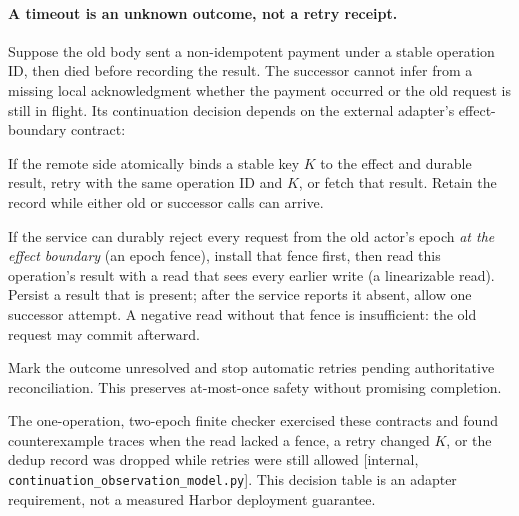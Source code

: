 \documentclass[11pt,a4paper]{article}
\theoremstyle{definition}
\begin{document}
\paragraph{A timeout is an unknown outcome, not a retry receipt.}\label{sec:stp-unknown-effect}
Suppose the old body sent a non-idempotent payment under a stable operation ID,
then died before recording the result. The successor cannot infer from a
missing local acknowledgment whether the payment occurred or the old request
is still in flight. Its continuation decision depends on the external
adapter's effect-boundary contract:
\begin{description}[leftmargin=1.8em,itemsep=2pt]
  \item[Atomic deduplication and result.] If the remote side atomically binds
  a stable key $K$ to the effect and durable result, retry with the same operation ID and $K$, or fetch that
  result. Retain the record while either old or successor calls can arrive.
  \item[Ordered readback and fence.] If the service can durably reject every
  request from the old actor's epoch \emph{at the effect boundary} (an epoch
  fence), install that fence first, then read this operation's result with a
  read that sees every earlier write (a linearizable read). Persist a result
  that is present; after the service reports it absent, allow one successor
  attempt. A negative read without that fence is insufficient: the old request
  may commit afterward.
  \item[Neither contract.] Mark the outcome unresolved and stop automatic
  retries pending authoritative reconciliation. This preserves at-most-once
  safety without promising completion.
\end{description}
The one-operation, two-epoch finite checker exercised these contracts and
found counterexample traces when the read lacked a fence, a retry changed
$K$, or the dedup record was dropped while retries were still allowed
[internal, \texttt{continuation\_observation\_model.py}]. This decision table
is an adapter requirement, not a measured Harbor deployment guarantee.
\end{document}
